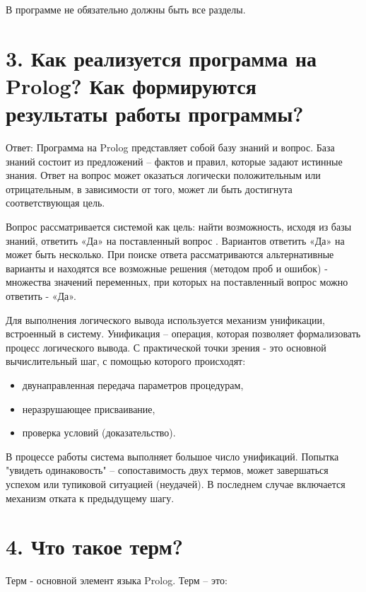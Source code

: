\documentclass[12pt]{report}
\begin{document}
В программе не обязательно должны быть все разделы.

\section*{3. Как реализуется программа на Prolog? Как формируются результаты работы программы?}

Ответ: Программа на Prolog представляет собой базу знаний и вопрос. База знаний состоит из предложений -- фактов и правил, которые задают истинные знания. Ответ на вопрос может оказаться логически положительным или отрицательным, в зависимости от того, может ли быть достигнута соответствующая цель. 

Вопрос рассматривается системой как цель: найти возможность, исходя из базы знаний, ответить «Да» на поставленный вопрос . Вариантов ответить «Да» на может быть несколько. При поиске ответа рассматриваются альтернативные варианты и находятся все возможные решения (методом проб и ошибок) - множества значений переменных, при которых на поставленный вопрос можно ответить - «Да».


Для выполнения логического вывода используется механизм унификации, встроенный в систему.
Унификация – операция, которая позволяет формализовать процесс логического вывода. С практической точки зрения  - это основной вычислительный шаг, с помощью которого происходят:
\begin{itemize}
	\item двунаправленная передача параметров процедурам,
	\item неразрушающее присваивание,
	\item проверка условий (доказательство).
\end{itemize}

В процессе работы система выполняет большое число унификаций.  Попытка "увидеть одинаковость" – сопоставимость двух термов, может завершаться успехом или тупиковой ситуацией (неудачей). В последнем случае включается механизм отката к предыдущему шагу.

\section*{4. Что такое терм?}

Терм - основной элемент языка Prolog. Терм – это:
\end{document}
